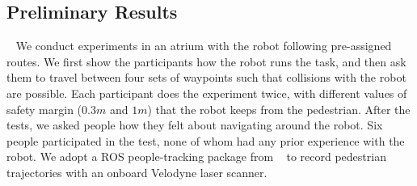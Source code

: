 \documentclass[conference]{IEEEtran}
\begin{document}
\subsection{Preliminary Results}~\label{sec:pre}
We conduct experiments in an atrium with the robot following pre-assigned 
routes. We first show the participants how the robot runs the task, and then 
ask them to travel between four sets of waypoints such that collisions with the 
robot are possible. Each participant does the experiment twice, with different values of 
safety margin ($0.3m$ and $1m$) that the robot keeps from the pedestrian. 
After the tests, we asked people how they felt about navigating around 
the robot. Six people participated in the test, none of whom had any prior experience 
with the robot. We adopt a ROS people-tracking package from ~\cite{leigh2015person} to record pedestrian trajectories with an onboard 
Velodyne laser scanner.
\end{document}
